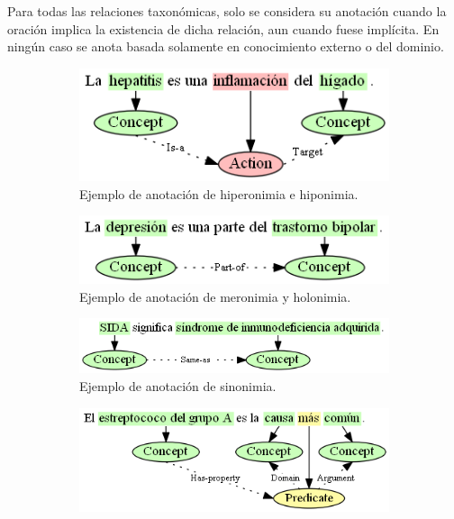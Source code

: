 Para todas las relaciones taxonómicas, solo se considera su anotación cuando la oración implica la existencia de dicha relación, aun cuando fuese implícita. En ningún caso se anota basada solamente en conocimiento externo o del dominio.

\begin{figure}[H]
	\centering
	\begin{subfigure}{3.1in}
		\includegraphics[width=\textwidth]{graphics/annotation_example_is_a.png}
		\caption{Ejemplo de anotación de hiperonimia e hiponimia.}
		\vspace{0.4in}
		\label{fig:annotation_example_is_a}
	\end{subfigure}
	\begin{subfigure}{3.25in}
		\includegraphics[width=\linewidth]{graphics/annotation_example_part_of.png}
		\caption{Ejemplo de anotación de meronimia y holonimia.}
		\vspace{0.4in}
		\label{fig:annotation_example_part_of}
	\end{subfigure}
	\begin{subfigure}{4.2in}
		\includegraphics[width=\linewidth]{graphics/annotation_example_same_as.png}
		\caption{Ejemplo de anotación de sinonimia.}
		\vspace{0.4in}
		\label{fig:annotation_example_same_as}
	\end{subfigure}
	\begin{subfigure}{3.9in}
		\includegraphics[width=\linewidth]{graphics/annotation_example_has_property.png}

\end{subfigure}
\end{figure}
